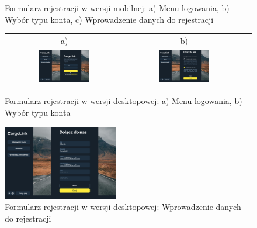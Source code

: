 \begin{figure}[H]
\begin{tabular}{@{}ccc@{}}
  \end{tabular}
 \caption{Formularz rejestracji w wersji mobilnej: a) Menu logowania, b) Wybór typu konta, c) Wprowadzenie danych do rejestracji}
 \label{fig:Formularz rejestracji - abc - mobile}
\end{figure}
\begin{figure}[H]
 \centering
  \begin{tabular}{@{}ccc@{}}
  a) & b)\\
  \includegraphics[width=0.45\textwidth]{rozdzial1/logowanie_d.jpg} &
  \includegraphics[width=0.45\textwidth]{rozdzial1/wybor_1_d.jpg}
  \end{tabular}
 \caption{Formularz rejestracji w wersji desktopowej: a) Menu logowania, b) Wybór typu konta}
 \label{fig:Formularz rejestracji - ab - desktop}
\end{figure}
\begin{figure}[H]
 \centering
  \includegraphics[width=0.45\textwidth]{rozdzial1/rejestracja_d.jpg}
 \caption{Formularz rejestracji w wersji desktopowej: Wprowadzenie danych do rejestracji}
 \label{fig:Formularz rejestracji - c - desktop}
\end{figure}
